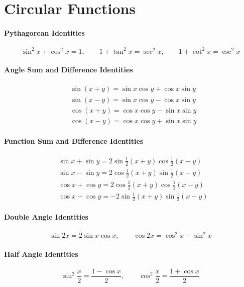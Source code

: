 \section{Circular Functions}

\paragraph{Pythagorean Identities}
\[      \sin^2 x + \cos^2 x = 1, \qquad
1 + \tan^2 x = \sec^2 x, \qquad
1 + \cot^2 x = \csc^2 x \]

\paragraph{Angle Sum and Difference Identities}
\begin{align*}
  &\sin(x+y) = \sin x \cos y + \cos x \sin y \\
  &\sin(x-y) = \sin x \cos y - \cos x \sin y \\
  &\cos(x+y) = \cos x \cos y - \sin x \sin y \\
  &\cos(x-y) = \cos x \cos y + \sin x \sin y 
\end{align*}

\paragraph{Function Sum and Difference Identities}
\begin{align*}
  &\sin x + \sin y = 2 \sin \frac{1}{2}(x+y) \cos \frac{1}{2}(x-y) \\
  &\sin x - \sin y = 2 \cos \frac{1}{2}(x+y) \sin \frac{1}{2}(x-y) \\
  &\cos x + \cos y = 2 \cos \frac{1}{2}(x+y) \cos \frac{1}{2}(x-y) \\
  &\cos x - \cos y =-2 \sin \frac{1}{2}(x+y) \sin \frac{1}{2}(x-y) 
\end{align*}


\paragraph{Double Angle Identities}
\[\sin 2x = 2 \sin x \cos x, \qquad \cos 2x = \cos^2 x - \sin^2 x \]


\paragraph{Half Angle Identities}
\[\sin^2 \frac{x}{2} = \frac{1-\cos x}{2}, \qquad
\cos^2 \frac{x}{2} = \frac{1+\cos x}{2} \]

